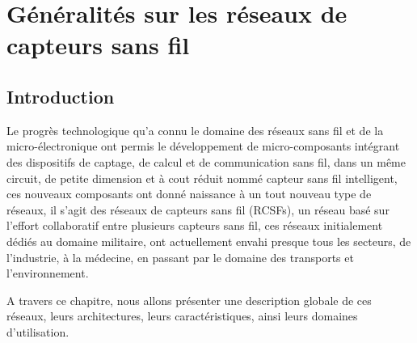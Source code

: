 \chapter{Généralités sur les réseaux de capteurs sans fil}
\section{Introduction}
        Le progrès technologique qu'a connu le domaine des réseaux sans fil et de la micro-électronique ont permis le développement de micro-composants intégrant des dispositifs de captage, de calcul et de communication sans fil, dans un même circuit, de petite dimension et à cout réduit nommé capteur sans fil intelligent, ces nouveaux composants  ont donné naissance à un tout nouveau type de réseaux, il s'agit des réseaux de capteurs sans fil (RCSFs), un réseau basé sur l'effort collaboratif entre plusieurs capteurs sans fil, ces réseaux initialement dédiés au domaine militaire, ont actuellement envahi presque tous les secteurs,  de l'industrie, à la médecine, en passant par le domaine des transports et l'environnement.
        
        
     A travers ce chapitre, nous allons présenter une description globale de ces réseaux, leurs architectures, leurs caractéristiques, ainsi leurs domaines d'utilisation.
        

